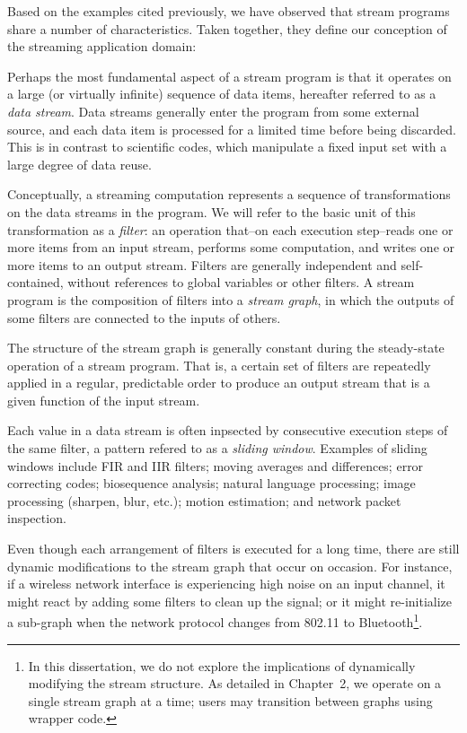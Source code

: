 Based on the examples cited previously, we have observed that stream
programs share a number of characteristics.  Taken together, they
define our conception of the streaming application domain:

\mybegin

  Perhaps the most fundamental
  aspect of a stream program is that it operates on a large (or
  virtually infinite) sequence of data items, hereafter referred to as
  a {\it data stream}.  Data streams generally enter the program from
  some external source, and each data item is processed for a limited
  time before being discarded.  This is in contrast to scientific
  codes, which manipulate a fixed input set with a large degree of
  data reuse.

  Conceptually, a streaming
  computation represents a sequence of transformations on the data
  streams in the program.  We will refer to the basic unit of this
  transformation as a {\it filter}: an operation that--on each
  execution step--reads one or more items from an input stream,
  performs some computation, and writes one or more items to an output
  stream.  Filters are generally independent and self-contained,
  without references to global variables or other filters.  A stream
  program is the composition of filters into a {\it stream graph}, in
  which the outputs of some filters are connected to the inputs of
  others.

  The structure of the stream
  graph is generally constant during the steady-state operation of a
  stream program.  That is, a certain set of filters are repeatedly
  applied in a regular, predictable order to produce an output stream
  that is a given function of the input stream.

  Each value in a data stream
is often inpsected by consecutive execution steps of the same filter,
a pattern refered to as a {\it sliding window}.  Examples of sliding
windows include FIR and IIR filters; moving averages and differences;
error correcting codes; biosequence analysis; natural language
processing; image processing (sharpen, blur, etc.); motion estimation;
and network packet inspection.

  Even though
  each arrangement of filters is executed for a long time, there are
  still dynamic modifications to the stream graph that occur on
  occasion.  For instance, if a wireless network interface is
  experiencing high noise on an input channel, it might react by
  adding some filters to clean up the signal; or it might
  re-initialize a sub-graph when the network protocol changes from
  802.11 to Bluetooth\footnote{In this dissertation, we do not explore
    the implications of dynamically modifying the stream structure.
    As detailed in Chapter~2, we operate on a single stream graph at a
    time; users may transition between graphs using wrapper code.}.

